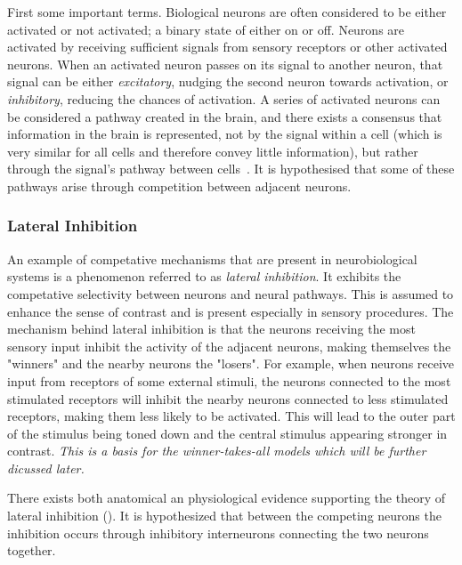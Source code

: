     First some important terms. Biological neurons are often considered to be either activated or not activated; a binary state of either on or off. Neurons are activated by receiving sufficient signals from sensory receptors or other activated neurons. When an activated neuron passes on its signal to another neuron, that signal can be either \textit{excitatory}, nudging the second neuron towards activation, or \textit{inhibitory}, reducing the chances of activation.  A series of activated neurons can be considered a pathway created in the brain, and there exists a consensus that information in the brain is represented, not by the signal within a cell (which is very similar for all cells and therefore convey little information), but rather through the signal's pathway between cells~\citep{Chen}. It is hypothesised that some of these pathways arise through competition between adjacent neurons. 
    
    \subsubsection{Lateral Inhibition}

        An example of competative mechanisms that are present in neurobiological systems is a phenomenon referred to as \textit{lateral inhibition}. It exhibits the competative selectivity between neurons and neural pathways. This is assumed to enhance the sense of contrast and is present especially in sensory procedures. The mechanism behind lateral inhibition is that the neurons receiving the most sensory input inhibit the activity of the adjacent neurons, making themselves the "winners" and the nearby neurons the "losers". For example, when neurons receive input from receptors of some external stimuli, the neurons connected to the most stimulated receptors will inhibit the nearby neurons connected to less stimulated receptors, making them less likely to be activated. This will lead to the outer part of the stimulus being toned down and the central stimulus appearing stronger in contrast. \textit{This is a basis for the winner-takes-all models which will be further dicussed later.}
        
        There exists both anatomical an physiological evidence supporting the theory of lateral inhibition (). It is hypothesized that between the competing neurons the inhibition occurs through inhibitory interneurons connecting the two neurons together.
        

